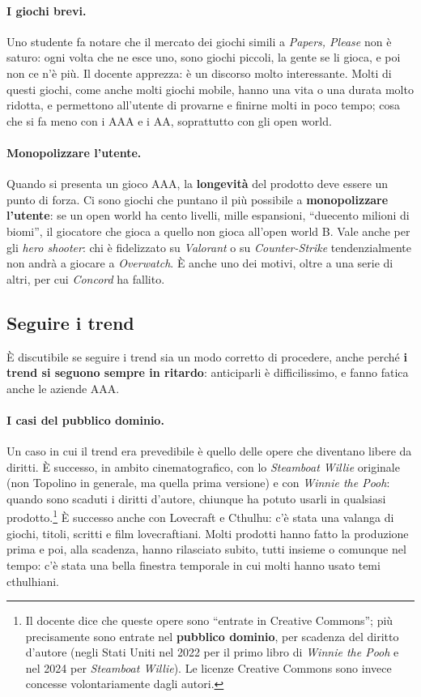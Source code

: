 \paragraph{I giochi brevi.} Uno studente fa notare che il mercato dei giochi
simili a \emph{Papers, Please} non è saturo: ogni volta che ne esce uno, sono
giochi piccoli, la gente se li gioca, e poi non ce n'è più. Il docente
apprezza: è un discorso molto interessante. Molti di questi giochi, come
anche molti giochi mobile, hanno una vita o una durata molto ridotta, e
permettono all'utente di provarne e finirne molti in poco tempo; cosa che si
fa meno con i AAA e i AA, soprattutto con gli open world.

\paragraph{Monopolizzare l'utente.} Quando si presenta un gioco AAA,
la \textbf{longevità} del prodotto deve essere un punto di forza. Ci sono
giochi che puntano il più possibile a \textbf{monopolizzare l'utente}: se un
open world ha cento livelli, mille espansioni, ``duecento milioni di biomi'',
il giocatore che gioca a quello non gioca all'open world B. Vale anche per gli
\emph{hero shooter}: chi è fidelizzato su \emph{Valorant} o su
\emph{Counter-Strike} tendenzialmente non andrà a giocare a \emph{Overwatch}.
È anche uno dei motivi, oltre a una serie di altri, per cui \emph{Concord} ha
fallito.

\subsection{Seguire i trend}

È discutibile se seguire i trend sia un modo corretto di procedere, anche
perché \textbf{i trend si seguono sempre in ritardo}: anticiparli è
difficilissimo, e fanno fatica anche le aziende AAA.

\paragraph{I casi del pubblico dominio.} Un caso in cui il trend era
prevedibile è quello delle opere che diventano libere da diritti. È successo,
in ambito cinematografico, con lo \emph{Steamboat Willie} originale (non
Topolino in generale, ma quella prima versione) e con \emph{Winnie the Pooh}:
quando sono scaduti i diritti d'autore, chiunque ha potuto usarli in qualsiasi
prodotto.\footnote{Il docente dice che queste opere sono ``entrate in Creative
Commons''; più precisamente sono entrate nel \textbf{pubblico dominio}, per
scadenza del diritto d'autore (negli Stati Uniti nel 2022 per il primo libro
di \emph{Winnie the Pooh} e nel 2024 per \emph{Steamboat Willie}). Le licenze
Creative Commons sono invece concesse volontariamente dagli autori.} È
successo anche con Lovecraft e Cthulhu: c'è stata una valanga di giochi,
titoli, scritti e film lovecraftiani. Molti prodotti hanno fatto la
produzione prima e poi, alla scadenza, hanno rilasciato subito, tutti insieme
o comunque nel tempo: c'è stata una bella finestra temporale in cui molti
hanno usato temi cthulhiani.

